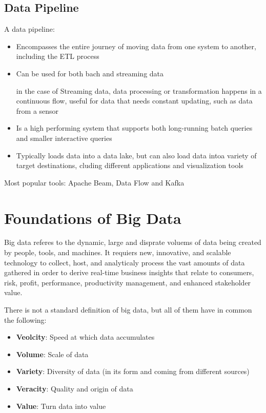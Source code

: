 \documentclass[../../ibm_data_analysis.tex]{subfiles}
\begin{document}
    \subsection{Data Pipeline}

    A data pipeline:
    \begin{itemize}
        \item Encompasses the entire journey of moving data from one system to another, including the ETL process
        \item Can be used for both bach and streaming data

        \begin{obs}
            in the case of Streaming data, data processing or transformation happens in a continuous flow, useful for data that needs constant updating, such as data from a sensor
        \end{obs}

        \item Is a high performing system that supports both long-running batch queries and smaller interactive queries
        \item Typically loads data into a data lake, but can also load data intoa  variety of target destinations, cluding different applications and visualization tools
    \end{itemize}

    Most popular tools: Apache Beam, Data Flow and Kafka

    \section{Foundations of Big Data}

    \begin{mydef}[Nombre]
        Big data referes to the dynamic, large and disprate voluems of data being created by people, tools, and machines. It requiers new, innovative, and scalable technology to collect, host, and analyticaly process the vast amounts of data gathered in order to derive real-time business insights that relate to consumers, risk, profit, performance, productivity management, and enhanced stakeholder value.  
    \end{mydef}

    There is not a standard definition of big data, but all of them have in common the following:
    \begin{itemize}
        \item \textbf{Veolcity}: Speed at which data accumulates
        \item \textbf{Volume}: Scale of data
        \item \textbf{Variety}: Diversity of data (in its form and coming from different sources)
        \item \textbf{Veracity}: Quality and origin of data
        \item \textbf{Value}: Turn data into value
    \end{itemize}
\end{document}
